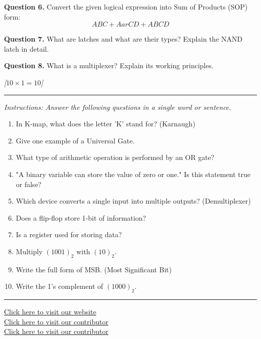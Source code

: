 \documentclass[11pt,a4paper]{article}
\newcommand{\pts}[1]{\hfill   \textit{[#1]}}
\begin{document}
\medskip


\noindent   \textbf{Question 6.} Convert the given logical expression into Sum of Products (SOP) form:
\[
A B C + A ar{C} D + A B C D
\]

\medskip


\noindent   \textbf{Question 7.} What are latches and what are their types? Explain the NAND latch in detail.

\medskip


\noindent   \textbf{Question 8.} What is a multiplexer? Explain its working principles.

\bigskip


\pts{$10  \times 1 = 10$}
\rule{\linewidth}{0.4pt}\smallskip




\noindent   \textit{Instructions: Answer the following questions in a single word or sentence.}


\begin{enumerate}[label=\arabic*.,leftmargin=*,itemsep=6pt]
  \item In K-map, what does the letter 'K' stand for? (Karnaugh)
  \item Give one example of a Universal Gate.
  \item What type of arithmetic operation is performed by an OR gate?
  \item "A binary variable can store the value of zero or one." Is this statement true or false?
  \item Which device converts a single input into multiple outputs? (Demultiplexer)
  \item Does a flip-flop store 1-bit of information?
  \item Is a register used for storing data?
  \item Multiply $(1001)_2$ with $(10)_2$.
  \item Write the full form of MSB. (Most Significant Bit)
  \item Write the 1's complement of $(1000)_2$.
\end{enumerate}

\vfill
\rule{\linewidth}{0.4pt}

\begin{center}\small
\href{https://bhu-exam.vercel.app/}{Click here to visit our website}\\[4pt]\href{https://me-aryan.vercel.app/}{Click here to visit our contributor}\\[4pt]\href{https://quashan-me.vercel.app/}{Click here to visit our contributor}
\end{center}
\end{document}
